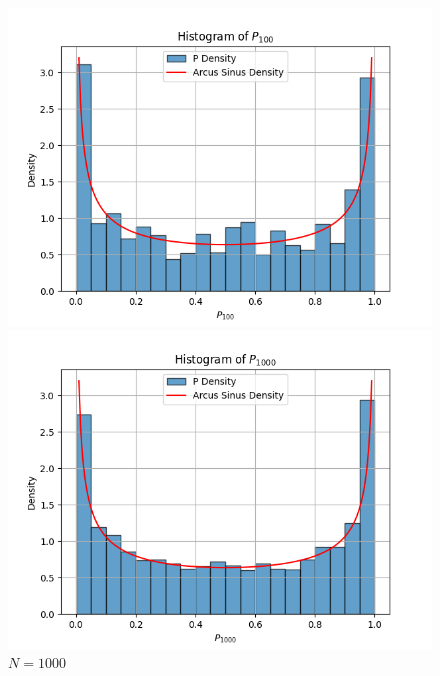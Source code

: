 \documentclass{article}
\begin{document}
\begin{figure}[H]
    \centering
        \begin{minipage}{0.24\textwidth}
        \centering
        \includegraphics[width=\linewidth]{ex3/ex3_100.png}
        \caption{$N=100$}
    \end{minipage}
        \begin{minipage}{0.24\textwidth}
        \centering
        \includegraphics[width=\linewidth]{ex3/ex3_1000.png}
        \caption{$N=1000$}
    \end{minipage}
        \begin{minipage}{0.24\textwidth}
        \centering

\end{minipage}
\end{figure}
\end{document}
